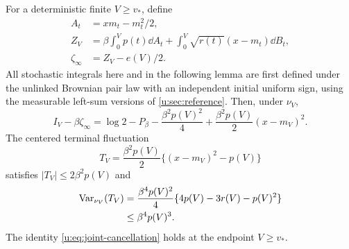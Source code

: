 \begin{lemma}\label{u:lem:joint}
For a deterministic finite $V\ge v_*$, define
\begin{equation}\label{u:eq:continuous-row-energy}
\begin{aligned}
 A_t&=xm_t-m_t^2/2,\\
 Z_V&=\beta\int_0^Vp(t)\dd A_t+
                         \int_0^V\sqrt{r(t)}(x-m_t)\dd B_t,\\
 \zeta_\infty&=Z_V-e(V)/2.
\end{aligned}
\end{equation}
All stochastic integrals here and in the following lemma are first defined under the unlinked Brownian pair law with an independent initial uniform sign, using the measurable left-sum versions of \cref{u:sec:reference}. Then, under $\nu_V$,
\begin{equation}\label{u:eq:joint-cancellation}
 I_V-\beta\zeta_\infty
 =\log2-P_\beta-\frac{\beta^2p(V)^2}{4}
                      +\frac{\beta^2p(V)}2(x-m_V)^2.
\end{equation}
The centered terminal fluctuation
\[
 T_V=\frac{\beta^2p(V)}2\{(x-m_V)^2-p(V)\}
\]
satisfies $|T_V|\le2\beta^2p(V)$ and
\begin{equation}\label{u:eq:terminal-variance}
\begin{aligned}
 \operatorname{Var}_{\nu_V}(T_V)
 &=\frac{\beta^4p(V)^2}{4}\{4p(V)-3r(V)-p(V)^2\}\\
 &\le\beta^4p(V)^3.
\end{aligned}
\end{equation}
The identity \eqref{u:eq:joint-cancellation} holds at the endpoint $V\ge v_*$.
\end{lemma}

